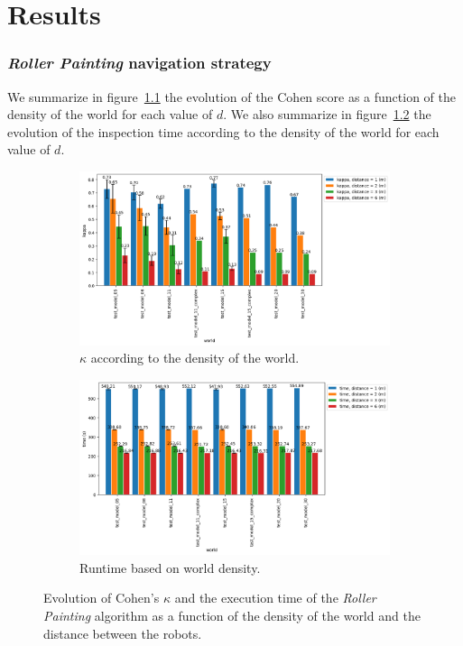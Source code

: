 
\chapter{Results}

\subsection*{\textit{Roller Painting} navigation strategy}

We summarize in figure~\ref{fig:peinture_au_rouleau-kappa_vs_world} the evolution of the Cohen score as a function of the density of the world for each value of $d$.
We also summarize in figure~\ref{fig:peinture_au_rouleau-time_vs_world} the evolution of the inspection time according to the density of the world for each value of $d$.

\begin{figure}[h!]
	\centering
	\begin{subfigure}[t]{0.9\linewidth}
		\includegraphics[width=\linewidth]{graphics/peinture_au_rouleau-kappa_vs_world_for_each_d.png}
		\caption{$\kappa$ according to the density of the world.}
		\label{fig:peinture_au_rouleau-kappa_vs_world}
	\end{subfigure}
	\hfill
	\begin{subfigure}[t]{0.9\linewidth}
			\includegraphics[width=\linewidth]{graphics/peinture_au_rouleau-time_vs_world_for_each_d.png}
			\caption{Runtime based on world density.}
			\label{fig:peinture_au_rouleau-time_vs_world}
	\end{subfigure}
	\caption{Evolution of Cohen's $\kappa$ and the execution time of the \textit{Roller Painting} algorithm as a function of the density of the world and the distance between the robots.}
	\label{fig:peinture_au_rouleau-world}
\end{figure}

